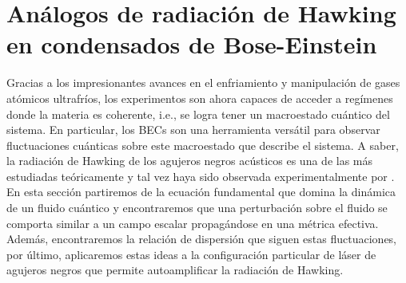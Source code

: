\section{An\'{a}logos de radiaci\'{o}n de Hawking en condensados de Bose-Einstein}

Gracias a los impresionantes avances en el enfriamiento y manipulación de gases atómicos ultrafríos, los experimentos son ahora capaces de  acceder a regímenes donde la materia es coherente, i.e., se logra tener un macroestado cu\'{a}ntico del sistema. En particular,  los BECs son una herramienta versátil para observar fluctuaciones cuánticas sobre este macroestado que describe el sistema. A saber, la radiación de Hawking de los agujeros negros acústicos es una de las más estudiadas te\'{o}ricamente y tal vez haya sido observada experimentalmente por \cite{de2019observation}.\\

En esta secci\'{o}n partiremos de la ecuaci\'{o}n fundamental que domina la din\'{a}mica de un fluido cu\'{a}ntico y encontraremos que una perturbaci\'{o}n sobre el fluido se comporta similar a un campo escalar propag\'{a}ndose en una m\'{e}trica efectiva. Adem\'{a}s, encontraremos la relaci\'{o}n de dispersi\'{o}n que siguen estas fluctuaciones, por \'{u}ltimo, aplicaremos estas ideas a la configuraci\'{o}n particular de l\'{a}ser de agujeros negros que permite autoamplificar la radiaci\'{o}n de Hawking.\\

